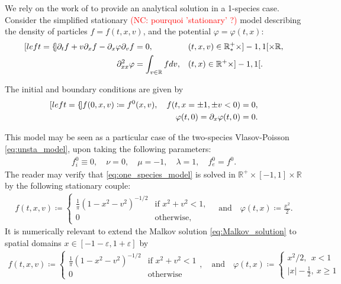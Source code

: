 \documentclass{article}
\numberwithin{equation}{section}
\newcommand{\R}{\mathbb{R}}
\newcommand{\mysubeq}[2]{ %
	\begin{subequations}\label{#1}
		\begin{align}[left = {\empheqlbrace}]
			#2
		\end{align}
	\end{subequations}	
}
\begin{document}
We rely on the work of \cite{malkovNonstationaryAntonovSelfgravitating2020} to provide an analytical solution in a 1-species case. Consider the simplified stationary {\textcolor{red}{(NC: pourquoi 'stationary' ?)}} model describing the density of particles $f = f(t,x,v)$, and the potential $\varphi=\varphi(t,x)$:
\mysubeq{eq:one_species_model}{
	\partial_t f + v \partial_x f  - \partial_x \varphi \partial_v f &= 0, && (t,x,v) \in \R^+_* \times ]-1,1[ \times \mathbb{R}, \label{sta_1sp_f} \\
	\partial^2_{xx} \varphi &= \int_{v\in\mathbb{R}} f dv, && (t,x) \in \R^+ \times ]-1,1[. \label{sta_phi}
}
The initial and boundary conditions are given by 
\mysubeq{eq:one_species_model_bc}{
	f(0,x,v) \coloneqq f^0(x,v), \quad f(t,x=\pm1, \pm v < 0) &= 0,  \\
	\varphi(t,0) = \partial_x \varphi (t,0) &= 0.  
}
This model may be seen as a particular case of the two-species Vlasov-Poisson \cref{eq:unsta_model}, upon taking the following parameters:
\begin{align*}
	f_i^0 \equiv 0, \quad \nu = 0, \quad \mu = -1, \quad \lambda = 1, \quad f_e^0 = f^0.
\end{align*}
The reader may verify that \cref{eq:one_species_model} is solved in $\R^+ \times [-1,1] \times \mathbb{R}$ by the following stationary couple:
\begin{align}\label{eq:Malkov_solution}
	f(t,x,v) \coloneqq 
	\begin{cases}
		\frac{1}{\pi} \left(1 - x^2 - v^2\right)^{-1/2} & \text{if } x^2 + v^2 < 1,  \\
		0 & \text{otherwise}, 
	\end{cases} \quad \text{and} \quad
	\varphi(t,x) \coloneqq \frac{x^2}{2}.
\end{align}
It is numerically relevant to extend the Malkov solution \cref{eq:Malkov_solution} to spatial domains $x \in [-1-\varepsilon, 1+\varepsilon]$ by 
\begin{align}\label{eq:Malkov_solution_ext}
	f(t,x,v) \coloneqq 
	\begin{cases}
		\frac{1}{\pi} \left(1 - x^2 - v^2\right)^{-1/2} & \text{if } x^2 + v^2 < 1 \\
		0 & \text{otherwise}
	\end{cases}, \quad \text{and} \quad
	\varphi(t,x) \coloneqq \left\{\begin{array}{c}
	x^2/2,\ \ x<1\\
	|x|-\frac{1}{2},\ x\ge 1
	\end{array}\right.%
\end{align}
\end{document}
